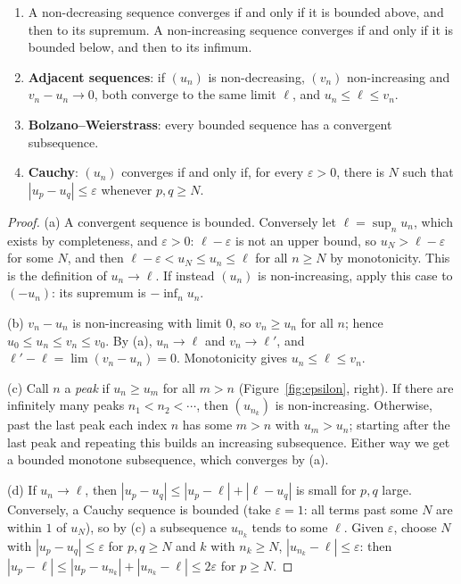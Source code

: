 \begin{proposition}\label{prop:seqcrit}
\begin{enumerate}[label=(\alph*)]
\item A non-decreasing sequence converges if and only if it is bounded above, and then to its supremum. A non-increasing sequence converges if and only if it is bounded below, and then to its infimum.
\item \textbf{Adjacent sequences}: if $(u_n)$ is non-decreasing, $(v_n)$ non-increasing and $v_n-u_n\to0$, both converge to the same limit $\ell$, and $u_n\le\ell\le v_n$.
\item \textbf{Bolzano--Weierstrass}: every bounded sequence has a convergent subsequence.
\item \textbf{Cauchy}: $(u_n)$ converges if and only if, for every $\varepsilon>0$, there is $N$ such that $|u_p-u_q|\le\varepsilon$ whenever $p,q\ge N$.
\end{enumerate}
\end{proposition}
\begin{proof}
(a) A convergent sequence is bounded. Conversely let $\ell=\sup_nu_n$, which exists by completeness, and $\varepsilon>0$: $\ell-\varepsilon$ is not an upper bound, so $u_N>\ell-\varepsilon$ for some $N$, and then $\ell-\varepsilon<u_N\le u_n\le\ell$ for all $n\ge N$ by monotonicity. This is the definition of $u_n\to\ell$. If instead $(u_n)$ is non-increasing, apply this case to $(-u_n)$: its supremum is $-\inf_nu_n$.

(b) $v_n-u_n$ is non-increasing with limit $0$, so $v_n\ge u_n$ for all $n$; hence $u_0\le u_n\le v_n\le v_0$. By (a), $u_n\to\ell$ and $v_n\to\ell'$, and $\ell'-\ell=\lim(v_n-u_n)=0$. Monotonicity gives $u_n\le\ell\le v_n$.

(c) Call $n$ a \emph{peak} if $u_n\ge u_m$ for all $m>n$ (Figure~\ref{fig:epsilon}, right). If there are infinitely many peaks $n_1<n_2<\cdots$, then $(u_{n_k})$ is non-increasing. Otherwise, past the last peak each index $n$ has some $m>n$ with $u_m>u_n$; starting after the last peak and repeating this builds an increasing subsequence. Either way we get a bounded monotone subsequence, which converges by (a).

(d) If $u_n\to\ell$, then $|u_p-u_q|\le|u_p-\ell|+|\ell-u_q|$ is small for $p,q$ large. Conversely, a Cauchy sequence is bounded (take $\varepsilon=1$: all terms past some $N$ are within $1$ of $u_N$), so by (c) a subsequence $u_{n_k}$ tends to some $\ell$. Given $\varepsilon$, choose $N$ with $|u_p-u_q|\le\varepsilon$ for $p,q\ge N$ and $k$ with $n_k\ge N$, $|u_{n_k}-\ell|\le\varepsilon$: then $|u_p-\ell|\le|u_p-u_{n_k}|+|u_{n_k}-\ell|\le2\varepsilon$ for $p\ge N$.
\end{proof}

